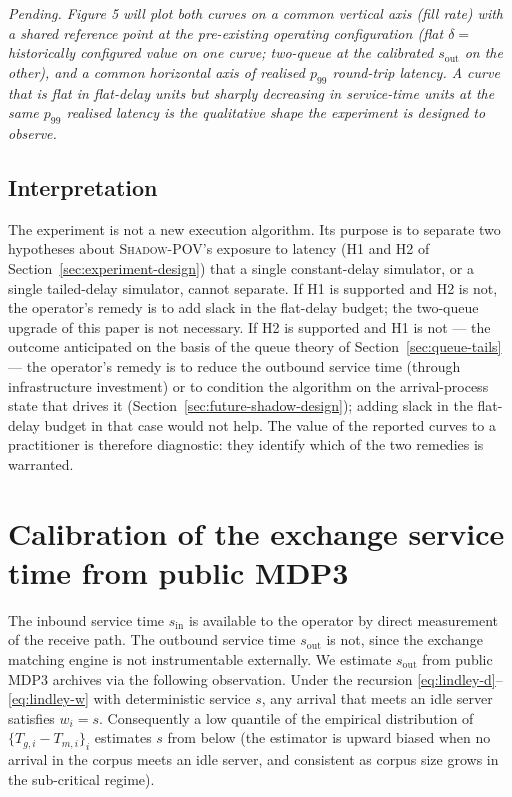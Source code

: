 \documentclass[11pt]{article}
\newcommand{\shadowpov}{\textsc{Shadow-POV}}
\begin{document}
\emph{Pending. Figure 5 will plot both curves on a common vertical axis (fill rate) with a shared reference point at the pre-existing operating configuration (flat $\delta = $ historically configured value on one curve; two-queue at the calibrated $s_{\mathrm{out}}$ on the other), and a common horizontal axis of realised $p_{99}$ round-trip latency. A curve that is flat in flat-delay units but sharply decreasing in service-time units at the same $p_{99}$ realised latency is the qualitative shape the experiment is designed to observe.}

\subsection{Interpretation}
\label{sec:experiment-interp}

The experiment is not a new execution algorithm. Its purpose is to separate two hypotheses about \shadowpov{}'s exposure to latency (H1 and H2 of Section~\ref{sec:experiment-design}) that a single constant-delay simulator, or a single tailed-delay simulator, cannot separate. If H1 is supported and H2 is not, the operator's remedy is to add slack in the flat-delay budget; the two-queue upgrade of this paper is not necessary. If H2 is supported and H1 is not --- the outcome anticipated on the basis of the queue theory of Section~\ref{sec:queue-tails} --- the operator's remedy is to reduce the outbound service time (through infrastructure investment) or to condition the algorithm on the arrival-process state that drives it (Section~\ref{sec:future-shadow-design}); adding slack in the flat-delay budget in that case would not help. The value of the reported curves to a practitioner is therefore diagnostic: they identify which of the two remedies is warranted.

\section{Calibration of the exchange service time from public MDP3}
\label{sec:calibration}

The inbound service time $s_{\mathrm{in}}$ is available to the operator by direct measurement of the receive path. The outbound service time $s_{\mathrm{out}}$ is not, since the exchange matching engine is not instrumentable externally. We estimate $s_{\mathrm{out}}$ from public MDP3 archives via the following observation. Under the recursion \eqref{eq:lindley-d}--\eqref{eq:lindley-w} with deterministic service $s$, any arrival that meets an idle server satisfies $w_i = s$. Consequently a low quantile of the empirical distribution of $\{T_{g,i} - T_{m,i}\}_i$ estimates $s$ from below (the estimator is upward biased when no arrival in the corpus meets an idle server, and consistent as corpus size grows in the sub-critical regime).
\end{document}
